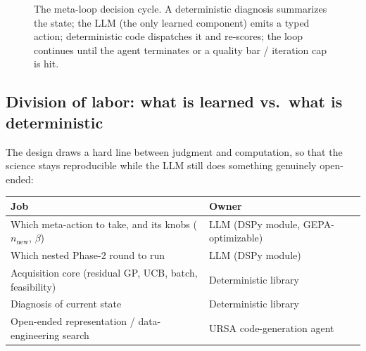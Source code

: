 \documentclass[11pt]{article}
\begin{document}
\begin{figure}[h]
\centering
{}
\caption{The meta-loop decision cycle. A deterministic diagnosis summarizes the state; the LLM
(the only learned component) emits a typed action; deterministic code dispatches it and re-scores;
the loop continues until the agent terminates or a quality bar / iteration cap is hit.}
\label{fig:meta}
\end{figure}

\subsection{Division of labor: what is learned vs.\ what is deterministic}
The design draws a hard line between judgment and computation, so that the science stays
reproducible while the LLM still does something genuinely open-ended:

\begin{center}
\begin{tabular}{@{}ll@{}}
\toprule
Job & Owner \\
\midrule
Which meta-action to take, and its knobs ($n_{\text{new}}$, $\beta$) & LLM (DSPy module, GEPA-optimizable) \\
Which nested Phase-2 round to run & LLM (DSPy module) \\
Acquisition core (residual GP, UCB, batch, feasibility) & Deterministic library \\
Diagnosis of current state & Deterministic library \\
Open-ended representation / data-engineering search & URSA code-generation agent \\
\bottomrule
\end{tabular}
\end{center}
\end{document}
